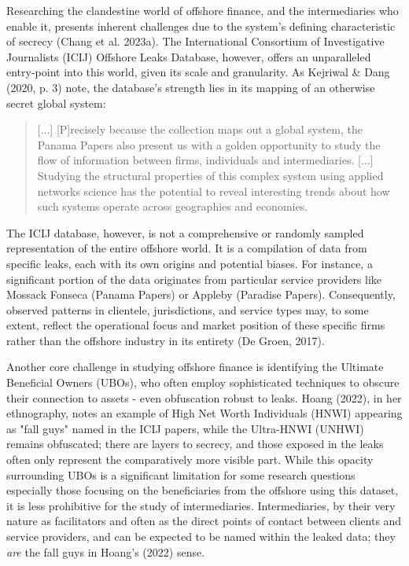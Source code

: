 Researching the clandestine world of offshore finance, and the intermediaries who enable it, presents inherent challenges due to the system's defining characteristic of secrecy (Chang et al. 2023a). The International Consortium of Investigative Journalists (ICIJ) Offshore Leaks Database, however, offers an unparalleled entry-point into this world, given its scale and granularity. As Kejriwal \& Dang (2020, p. 3) note, the database's strength lies in its mapping of an otherwise secret global system:

\begin{quote}
    [...] [P]recisely because the collection maps out a global system, the Panama Papers also present us with a golden opportunity to study the flow of information between firms, individuals and intermediaries. [...] Studying the structural properties of this complex system using applied networks science has the potential to reveal interesting trends about how such systems operate across geographies and economies.
\end{quote}

The ICIJ database, however, is not a comprehensive or randomly sampled representation of the entire offshore world. It is a compilation of data from specific leaks, each with its own origins and potential biases. For instance, a significant portion of the data originates from particular service providers like Mossack Fonseca (Panama Papers) or Appleby (Paradise Papers). Consequently, observed patterns in clientele, jurisdictions, and service types may, to some extent, reflect the operational focus and market position of these specific firms rather than the offshore industry in its entirety (De Groen, 2017). 

Another core challenge in studying offshore finance is identifying the Ultimate Beneficial Owners (UBOs), who often employ sophisticated techniques to obscure their connection to assets - even obfuscation robust to leaks. Hoang (2022), in her ethnography, notes an example of High Net Worth Individuals (HNWI) appearing as "fall guys" named in the ICIJ papers, while the Ultra-HNWI (UNHWI) remains obfuscated; there are layers to secrecy, and those exposed in the leaks often only represent the comparatively more visible part. While this opacity surrounding UBOs is a significant limitation for some research questions especially those focusing on the beneficiaries from the offshore using this dataset, it is less prohibitive for the study of intermediaries. Intermediaries, by their very nature as facilitators and often as the direct points of contact between clients and service providers, and can be expected to be named within the leaked data; they \textit{are} the fall guys in Hoang's (2022) sense.

